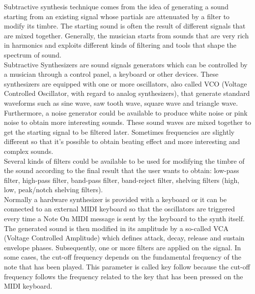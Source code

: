 \documentclass{article}
\begin{document}
Subtractive synthesis technique comes from the idea of generating a sound starting from an existing signal whose partials are attenuated by a filter to modify its timbre. The starting sound is often the result of different signals that are mixed together. Generally, the musician starts from sounds that are very rich in harmonics and exploits different kinds of filtering and tools that shape the spectrum of sound.
\\Subtractive Synthesizers are sound signals generators which can be controlled by a musician through a control panel, a keyboard or other devices. These synthesizers are equipped with one or more oscillators, also called VCO (Voltage Controlled Oscillator, with regard to analog synthesizers), that generate standard waveforms such as sine wave, saw tooth wave, square wave and triangle wave. Furthermore, a noise generator could be available to produce white noise or pink noise to obtain more interesting sounds. These sound waves are mixed together to get the starting signal to be filtered later. Sometimes frequencies are slightly different so that it's possible to obtain beating effect and more interesting and complex sounds.
\\Several kinds of filters could be available to be used for modifying the timbre of the sound according to the final result that the user wants to obtain: low-pass filter, high-pass filter, band-pass filter, band-reject filter, shelving filters (high, low, peak/notch shelving filters).
\\Normally a hardware synthesizer is provided with a keyboard or it can be connected to an external MIDI keyboard so that the oscillators are triggered every time a Note On MIDI message is sent by the keyboard to the synth itself. The generated sound is then modified in its amplitude by a so-called VCA (Voltage Controlled Amplitude) which defines attack, decay, release and sustain envelope phases. Subsequently, one or more filters are applied on the signal. In some cases, the cut-off frequency depends on the fundamental frequency of the note that has been played. This parameter is called key follow because the cut-off frequency follows the frequency related to the key that has been pressed on the MIDI keyboard.
\end{document}
